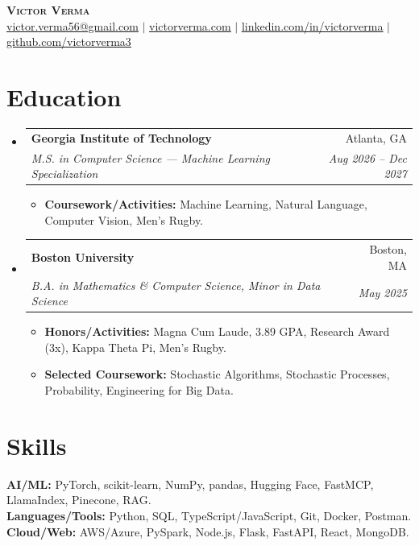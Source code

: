 \documentclass[letterpaper,11pt]{article}
\makeatletter
\newcommand{\resumeItem}[1]{
  \item\small{
    {#1 \vspace{-2pt}}
  }
}
\newcommand{\resumeSubheading}[4]{
  \vspace{-2pt}\item
    \begin{tabular*}{0.97\textwidth}[t]{l@{\extracolsep{\fill}}r}
      \textbf{#1} & #2 \\
      \textit{\small#3} & \textit{\small #4} \\
    \end{tabular*}\vspace{-7pt}
}
\newcommand{\resumeSubHeadingListStart}{\begin{itemize}[leftmargin=0.15in, label={}]}
\newcommand{\resumeSubHeadingListEnd}{\end{itemize}}
\newcommand{\resumeItemListStart}{\begin{itemize}}
\newcommand{\resumeItemListEnd}{\end{itemize}\vspace{-5pt}}
\makeatother
\begin{document}
\begin{center}
    \textbf{\Large \scshape Victor Verma} \\ \vspace{1pt}
    \href{mailto:victor.verma56@gmail.com}{\underline{victor.verma56@gmail.com}} $\mid$
    \href{https://www.victorverma.com}{\underline{victorverma.com}} $\mid$ 
    \href{https://linkedin.com/in/victorverma/}{\underline{linkedin.com/in/victorverma}} $\mid$
    \href{https://github.com/victorverma3}{\underline{github.com/victorverma3}}
\end{center}


\section{Education}
  \resumeSubHeadingListStart
    \resumeSubheading
      {Georgia Institute of Technology}{Atlanta, GA}
      {M.S. in Computer Science --- Machine Learning Specialization}{Aug 2026 -- Dec 2027}
      \resumeItemListStart
        \resumeItem{\textbf{Coursework/Activities:} Machine Learning, Natural Language, Computer Vision, Men's Rugby.}
      \resumeItemListEnd

    \resumeSubheading
      {Boston University}{Boston, MA}
      {B.A. in Mathematics \& Computer Science, Minor in Data Science}{May 2025}
      \resumeItemListStart
        \resumeItem{\textbf{Honors/Activities:} Magna Cum Laude, 3.89 GPA, Research Award (3x), Kappa Theta Pi, Men’s Rugby.}
        \resumeItem{\textbf{Selected Coursework:} Stochastic Algorithms, Stochastic Processes, Probability, Engineering for Big Data.}
      \resumeItemListEnd
  \resumeSubHeadingListEnd
  
\section{Skills}
 \begin{itemize}[leftmargin=0.15in, label={}]
    \small{\item{
     \textbf{AI/ML:}{ PyTorch, scikit-learn, NumPy, pandas, Hugging Face, FastMCP, LlamaIndex, Pinecone, RAG.} \\
     \textbf{Languages/Tools:}{ Python, SQL, TypeScript/JavaScript, Git, Docker, Postman.} \\
     \textbf{Cloud/Web:}{ AWS/Azure, PySpark, Node.js, Flask, FastAPI, React, MongoDB.}
    }}
 \end{itemize}
\end{document}
